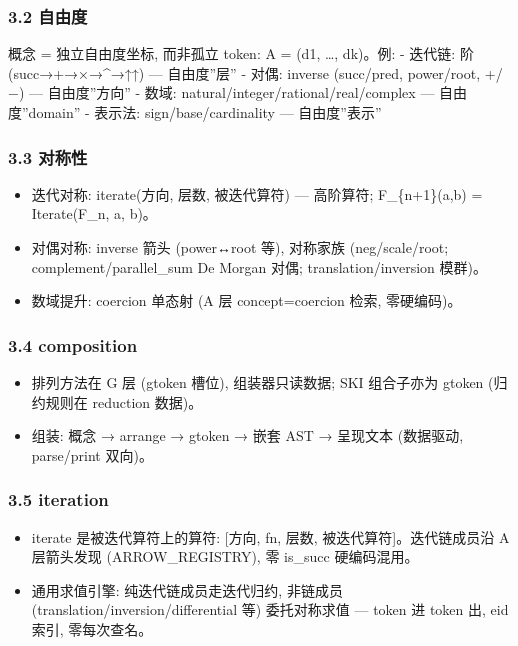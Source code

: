 \documentclass[
]{article}
\providecommand{\tightlist}{%
  \setlength{\itemsep}{0pt}\setlength{\parskip}{0pt}}
\begin{document}
\subsubsection{3.2 自由度}\label{ux81eaux7531ux5ea6}

概念 = 独立自由度坐标, 而非孤立 token: A = (d1, \ldots, dk)。例: -
迭代链: 阶 (succ→+→×→\^{}→↑↑) --- 自由度''层'' - 对偶: inverse
(succ/pred, power/root, +/−) --- 自由度''方向'' - 数域:
natural/integer/rational/real/complex --- 自由度''domain'' - 表示法:
sign/base/cardinality --- 自由度''表示''

\subsubsection{3.3 对称性}\label{ux5bf9ux79f0ux6027}

\begin{itemize}
\tightlist
\item
  迭代对称: iterate(方向, 层数, 被迭代算符) --- 高阶算符;
  F\_\{n+1\}(a,b) = Iterate(F\_n, a, b)。
\item
  对偶对称: inverse 箭头 (power↔root 等), 对称家族 (neg/scale/root;
  complement/parallel\_sum De Morgan 对偶; translation/inversion 模群)。
\item
  数域提升: coercion 单态射 (A 层 concept=coercion 检索, 零硬编码)。
\end{itemize}

\subsubsection{3.4 composition}\label{composition}

\begin{itemize}
\tightlist
\item
  排列方法在 G 层 (gtoken 槽位), 组装器只读数据; SKI 组合子亦为 gtoken
  (归约规则在 reduction 数据)。
\item
  组装: 概念 → arrange → gtoken → 嵌套 AST → 呈现文本 (数据驱动,
  parse/print 双向)。
\end{itemize}

\subsubsection{3.5 iteration}\label{iteration}

\begin{itemize}
\tightlist
\item
  iterate 是被迭代算符上的算符: {[}方向, fn, 层数,
  被迭代算符{]}。迭代链成员沿 A 层箭头发现 (ARROW\_REGISTRY), 零
  is\_succ 硬编码混用。
\item
  通用求值引擎: 纯迭代链成员走迭代归约, 非链成员
  (translation/inversion/differential 等) 委托对称求值 --- token 进
  token 出, eid 索引, 零每次查名。
\end{itemize}
\end{document}

